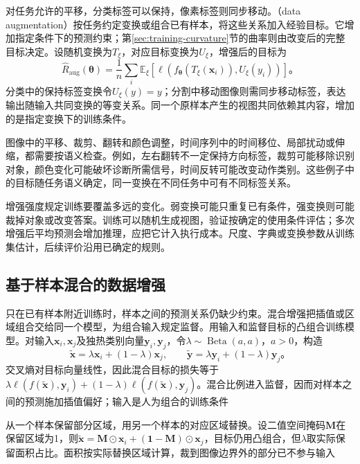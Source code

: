 对任务允许的平移，分类标签可以保持，像素标签则同步移动。（data augmentation）按任务约定变换或组合已有样本，将这些关系加入经验目标。它增加指定条件下的预测约束；第\ref{sec:training-curvature}节的曲率则由改变后的完整目标决定。设随机变换为$T_{\xi}$，对应目标变换为$U_{\xi}$，增强后的目标为
\begin{equation}
  \hat R_{\mathrm{aug}}(\bm\theta)
  =\frac1n\sum_i\mathbb E_{\xi}
    [\ell(f_{\bm\theta}(T_{\xi}(\bm x_i)),U_{\xi}(y_i))]\text{。}
  \label{eq:generalization-augmentation-risk}
\end{equation}
分类中的保持标签变换令$U_{\xi}(y)=y$；分割中移动图像则需同步移动标签，表达输出随输入共同变换的等变关系。同一个原样本产生的视图共同依赖其内容，增加的是指定变换下的训练条件。

图像中的平移、裁剪、翻转和颜色调整，时间序列中的时间移位、局部扰动或伸缩，都需要按语义检查。例如，左右翻转不一定保持方向标签，裁剪可能移除识别对象，颜色变化可能破坏诊断所需信号，时间反转可能改变动作类别。这些例子中的目标随任务语义确定，同一变换在不同任务中可有不同标签关系。

增强强度规定训练要覆盖多远的变化。弱变换可能只重复已有条件，强变换则可能裁掉对象或改变答案。训练可以随机生成视图，验证按确定的使用条件评估；多次增强后平均预测会增加推理，应把它计入执行成本。尺度、字典或变换参数从训练集估计，后续评价沿用已确定的规则。

\subsection{基于样本混合的数据增强}
\label{sec:generalization-sample-mixing}

只在已有样本附近训练时，样本之间的预测关系仍缺少约束。混合增强把插值或区域组合交给同一个模型，为组合输入规定监督。用输入和监督目标的凸组合训练模型。对输入$\bm x_i,\bm x_j$及独热类别向量$\bm y_i,\bm y_j$，令$\lambda\sim\operatorname{Beta}(a,a)$，$a>0$，构造
\begin{equation}
  \tilde{\bm x}=\lambda\bm x_i+(1-\lambda)\bm x_j,\qquad
  \tilde{\bm y}=\lambda\bm y_i+(1-\lambda)\bm y_j\text{。}
  \label{eq:generalization-mixup}
\end{equation}
交叉熵对目标向量线性，因此混合目标的损失等于$\lambda\ell(f(\tilde{\bm x}),\bm y_i)+(1-\lambda)\ell(f(\tilde{\bm x}),\bm y_j)$。混合比例进入监督，因而对样本之间的预测施加插值偏好；输入是人为组合的训练条件

从一个样本保留部分区域，用另一个样本的对应区域替换。设二值空间掩码$\bm M$在保留区域为1，则$\tilde{\bm x}=\bm M\odot\bm x_i+(\bm1-\bm M)\odot\bm x_j$，目标仍用凸组合，但$\lambda$取实际保留面积占比。面积按实际替换区域计算，裁到图像边界外的部分已不参与输入

